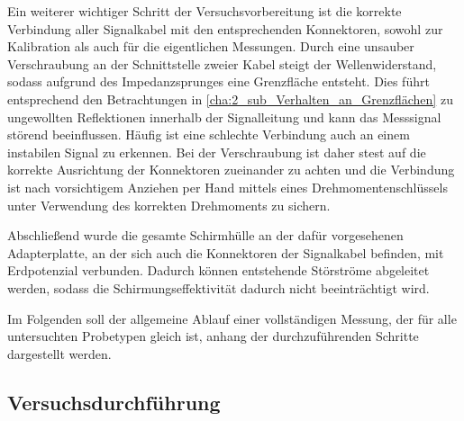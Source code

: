 Ein weiterer wichtiger Schritt der Versuchsvorbereitung ist die korrekte Verbindung aller Signalkabel mit den entsprechenden Konnektoren, sowohl zur Kalibration als auch für die eigentlichen Messungen. Durch eine unsauber Verschraubung an der Schnittstelle zweier Kabel steigt der Wellenwiderstand, sodass aufgrund des Impedanzsprunges eine Grenzfläche entsteht. Dies führt entsprechend den Betrachtungen in \Abschnitt\ref{cha:2_sub_Verhalten_an_Grenzflächen} zu ungewollten Reflektionen innerhalb der Signalleitung und kann das Messsignal störend beeinflussen. Häufig ist eine schlechte Verbindung auch an einem instabilen Signal zu erkennen. Bei der Verschraubung ist daher stest auf die korrekte Ausrichtung der Konnektoren zueinander zu achten und die Verbindung ist nach vorsichtigem Anziehen per Hand mittels eines Drehmomentenschlüssels unter Verwendung des korrekten Drehmoments zu sichern.
\par
\vspace{\linespace}
Abschließend wurde die gesamte Schirmhülle an der dafür vorgesehenen Adapterplatte, an der sich auch die Konnektoren der Signalkabel befinden, mit Erdpotenzial verbunden. Dadurch können entstehende Störströme abgeleitet werden, sodass die Schirmungseffektivität dadurch nicht beeinträchtigt wird. 
\par
\vspace{\linespace}
Im Folgenden soll der allgemeine Ablauf einer vollständigen Messung, der für alle untersuchten Probetypen gleich ist, anhang der durchzuführenden Schritte dargestellt werden. 


\subsection{Versuchsdurchführung}

